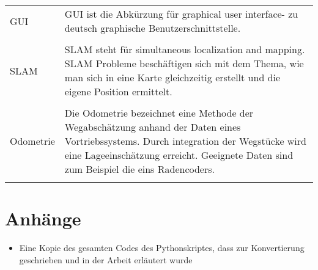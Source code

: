 \documentclass[11pt]{scrartcl}
\begin{document}
\begin{onehalfspace}
\begin{tabular}{l p{12cm}}
  GUI&GUI ist die Abkürzung für graphical user interface- zu deutsch graphische Benutzerschnittstelle. \\\\
  
  SLAM& SLAM steht für simultaneous localization and mapping. SLAM Probleme beschäftigen sich mit dem Thema, wie man sich in eine Karte gleichzeitig erstellt und die eigene Position ermittelt.\\\\
  
  Odometrie& Die Odometrie bezeichnet eine Methode der Wegabschätzung anhand der Daten eines Vortriebssystems. Durch integration der Wegstücke wird eine Lageeinschätzung erreicht. Geeignete Daten sind zum Beispiel die eins Radencoders.\\\\
  
  
 \end{tabular}
 
 \section{Anhänge}
 \begin{itemize}
 \item Eine Kopie des gesamten Codes des Pythonskriptes, dass zur Konvertierung geschrieben und in der Arbeit erläutert wurde

 \end{itemize}

\end{onehalfspace}
\end{document}
